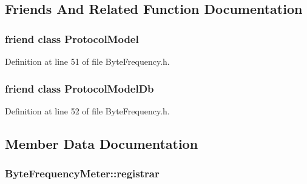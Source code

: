 \subsection{Friends And Related Function Documentation}
\hypertarget{class_vsid_1_1_byte_frequency_meter_a80219b863d4ff3456933d16bc5f73f45}{
\subsubsection[{Protocol\-Model}]{\setlength{\rightskip}{0pt plus 5cm}friend class {\bf Protocol\-Model}\hspace{0.3cm}{\ttfamily [friend]}}}\label{class_vsid_1_1_byte_frequency_meter_a80219b863d4ff3456933d16bc5f73f45}


Definition at line 51 of file Byte\-Frequency.\-h.

\hypertarget{class_vsid_1_1_byte_frequency_meter_a3c0d389e7a9476b06313d8fb9ca9fe68}{
\subsubsection[{Protocol\-Model\-Db}]{\setlength{\rightskip}{0pt plus 5cm}friend class {\bf Protocol\-Model\-Db}\hspace{0.3cm}{\ttfamily [friend]}}}\label{class_vsid_1_1_byte_frequency_meter_a3c0d389e7a9476b06313d8fb9ca9fe68}


Definition at line 52 of file Byte\-Frequency.\-h.



\subsection{Member Data Documentation}
\hypertarget{class_vsid_1_1_byte_frequency_meter_a28b70dd183b9091db0532cbed2b44871}{
\subsubsection[{registrar}]{ Byte\-Frequency\-Meter\-::registrar\hspace{0.3cm}{\ttfamily [static]}}}\label{class_vsid_1_1_byte_frequency_meter_a28b70dd183b9091db0532cbed2b44871}


